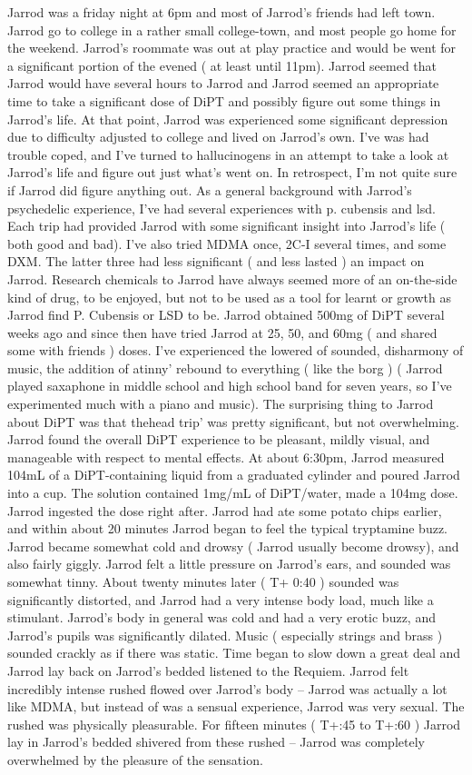 \documentclass[12pt]{book}
\begin{document}
Jarrod was a friday night at 6pm and most of Jarrod's friends had left town. Jarrod go to college in a rather small college-town, and most people go home for the weekend. Jarrod's roommate was out at play practice and would be went for a significant portion of the evened ( at least until 11pm). Jarrod seemed that Jarrod would have several hours to Jarrod and Jarrod seemed an appropriate time to take a significant dose of DiPT and possibly figure out some things in Jarrod's life. At that point, Jarrod was experienced some significant depression due to difficulty adjusted to college and lived on Jarrod's own. I've was had trouble coped, and I've turned to hallucinogens in an attempt to take a look at Jarrod's life and figure out just what's went on. In retrospect, I'm not quite sure if Jarrod did figure anything out. As a general background with Jarrod's psychedelic experience, I've had several experiences with p. cubensis and lsd. Each trip had provided Jarrod with some significant insight into Jarrod's life ( both good and bad). I've also tried MDMA once, 2C-I several times, and some DXM. The latter three had less significant ( and less lasted ) an impact on Jarrod. Research chemicals to Jarrod have always seemed more of an on-the-side kind of drug, to be enjoyed, but not to be used as a tool for learnt or growth as Jarrod find P. Cubensis or LSD to be. Jarrod obtained 500mg of DiPT several weeks ago and since then have tried Jarrod at 25, 50, and 60mg ( and shared some with friends ) doses. I've experienced the lowered of sounded, disharmony of music, the addition of atinny' rebound to everything ( like the borg ) ( Jarrod played saxaphone in middle school and high school band for seven years, so I've experimented much with a piano and music). The surprising thing to Jarrod about DiPT was that thehead trip' was pretty significant, but not overwhelming. Jarrod found the overall DiPT experience to be pleasant, mildly visual, and manageable with respect to mental effects. At about 6:30pm, Jarrod measured 104mL of a DiPT-containing liquid from a graduated cylinder and poured Jarrod into a cup. The solution contained 1mg/mL of DiPT/water, made a 104mg dose. Jarrod ingested the dose right after. Jarrod had ate some potato chips earlier, and within about 20 minutes Jarrod began to feel the typical tryptamine buzz. Jarrod became somewhat cold and drowsy ( Jarrod usually become drowsy), and also fairly giggly. Jarrod felt a little pressure on Jarrod's ears, and sounded was somewhat tinny. About twenty minutes later ( T+ 0:40 ) sounded was significantly distorted, and Jarrod had a very intense body load, much like a stimulant. Jarrod's body in general was cold and had a very erotic buzz, and Jarrod's pupils was significantly dilated. Music ( especially strings and brass ) sounded crackly as if there was static. Time began to slow down a great deal and Jarrod lay back on Jarrod's bedded listened to the Requiem. Jarrod felt incredibly intense rushed flowed over Jarrod's body -- Jarrod was actually a lot like MDMA, but instead of was a sensual experience, Jarrod was very sexual. The rushed was physically pleasurable. For fifteen minutes ( T+:45 to T+:60 ) Jarrod lay in Jarrod's bedded shivered from these rushed -- Jarrod was completely overwhelmed by the pleasure of the sensation. 
\end{document}
